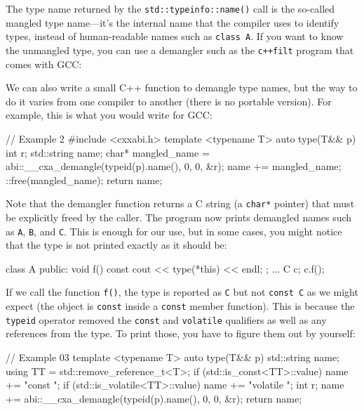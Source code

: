 The type name returned by the \texttt{std::typeinfo::name()} call is the so-called mangled type name---it's the internal name that the compiler uses to identify types, instead of human-readable names such as \texttt{class\ A}. If you want to know the unmangled type, you can use a demangler such as the \texttt{c++filt} program that comes with GCC:


We can also write a small C++ function to demangle type names, but the way to do it varies from one compiler to another (there is no portable version). For example, this is what you would write for GCC:

\begin{code}
// Example 2
#include <cxxabi.h>
template <typename T> auto type(T&& p) {
  int r;
  std::string name;
  char* mangled_name =
    abi::__cxa_demangle(typeid(p).name(), 0, 0, &r);
  name += mangled_name;
  ::free(mangled_name);
  return name;
}
\end{code}

Note that the demangler function returns a C string (a \texttt{char*} pointer) that must be explicitly freed by the caller. The program now prints demangled names such as \texttt{A}, \texttt{B}, and \texttt{C}. This is enough for our use, but in some cases, you might notice that the type is not printed exactly as it should be:

\begin{code}
class A {
  public:
  void f() const { cout << type(*this) << endl; }
};
...
C c;
c.f();
\end{code}

If we call the function \texttt{f()}, the type is reported as \texttt{C} but not \texttt{const\ C} as we might expect (the object is \texttt{const} inside a \texttt{const} member function). This is because the \texttt{typeid} operator removed the \texttt{const} and \texttt{volatile} qualifiers as well as any references from the type. To print those, you have to figure them out by yourself:

\begin{code}
// Example 03
template <typename T> auto type(T&& p) {
  std::string name;
  using TT = std::remove_reference_t<T>;
  if (std::is_const<TT>::value) name += "const ";
  if (std::is_volatile<TT>::value) name += "volatile ";
  int r;
  name += abi::__cxa_demangle(typeid(p).name(), 0, 0, &r);
  return name;
}
\end{code}

